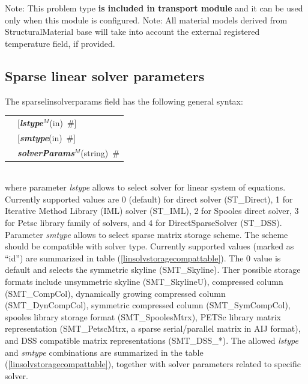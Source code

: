 \documentclass[a4paper]{article}
\makeatletter
\newcommand{\param}[1]{{\em #1}}
\newcommand{\keywordnotype}[1]{\mbox{{\it{\bf{#1}}}}}
\newcommand{\keyword}[2]{\mbox{{\keywordnotype{#1}\tiny (#2)}}}
\newcommand{\field}[2]{\mbox{\keyword{#1}{#2}~\#}}
\newcommand{\optField}[2]{\mbox{[\field{#1}{#2}]}}
\newenvironment{record}[1][]{\begin{tabular}{|ll}}{\end{tabular}\\}
\newcommand{\recentry}[2]{{#1}&{#2}\\}
\newcounter{rcc}
\newenvironment{record}[1][\textwidth]{\setcounter{rcc}{0}\begin{tabular*}{#1}{|ll@{\extracolsep{\fill}}r}}{\end{tabular*}\\}
\newcommand{\recentry}[2]{\ifthenelse{\value{rcc}>0}{&$\backslash$ \\}{\setcounter{rcc}{1}}{#1}&{#2}}
\makeatother
\begin{document}
Note: This problem type {\bf is included in transport module} and it
can be used only when this module is configured.
Note: All material models derived from StructuralMaterial base will
take into account the external registered temperature field, if
provided.

\subsection{Sparse linear solver parameters}
\label{sparselinsolver}
The sparselinsolverparams field has the following general syntax:\\
\begin{record}
\recentry{\hspace{20mm}}{\optField{lstype$^M$}{in}} \recentry{}{\optField{smtype}{in}} \recentry{}{\field{solverParams$^M$}{string}}
\end{record}
where parameter \param{lstype} allows to select solver for linear system of
equations. Currently supported values are 0 (default) for direct solver
(ST\_Direct), 1 for Iterative Method Library (IML) solver (ST\_IML), 
2 for Spooles direct solver, 3 for Petsc
library family of solvers, and 4 for DirectSparseSolver (ST\_DSS).
Parameter \param{smtype} allows to select sparse matrix storage
scheme. The scheme should be compatible with solver type.
Currently supported values (marked as ``id'') are summarized in table
(\ref{linsolvstoragecompattable}). The 0 value is default and selects
the symmetric skyline (SMT\_Skyline). Ther possible storage formats
include unsymmetric skyline (SMT\_SkylineU), 
compressed column (SMT\_CompCol), dynamically growing compressed
column (SMT\_DynCompCol), symmetric compressed column
(SMT\_SymCompCol), spooles library storage format (SMT\_SpoolesMtrx),
PETSc library matrix representation (SMT\_PetscMtrx, a sparse
serial/parallel matrix in AIJ format), and DSS compatible matrix
representations (SMT\_DSS\_*).
The allowed \param{lstype} and \param{smtype} combinations are
summarized in the table (\ref{linsolvstoragecompattable}), together
with solver parameters related to specific solver.
\end{document}
